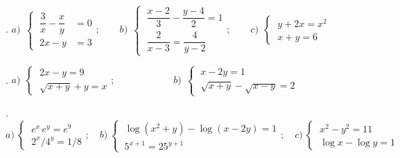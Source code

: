 \begin{mipropuesto}
. $a)\ \ \begin{cases}	\ \dfrac 3 x - \dfrac x y &=0\\ \ 2x-y&=3 \end{cases};\qquad  b)\ \ \begin{cases} \ \dfrac{x-2}{3}-\dfrac{y-4}{2}=1  \\ \  \dfrac{2}{x-3}=\dfrac{4}{y-2} \end{cases}; \qquad c)\ \ \begin{cases} \ y+2x=x^2\\\ x+y=6 \end{cases} $
\end{mipropuesto}
\vspace{-8mm}
\begin{flushright}
	\begin{footnotesize} \textcolor{gris}{}	\end{footnotesize}
\end{flushright}

\begin{mipropuesto}
. 	$a)\ \ \begin{cases} \ 2x-y=9 \\ \ \sqrt{x+y}+y=x \end{cases} ; \qquad \qquad \qquad b) \ \ \begin{cases}  \ x-2y=1\\ \ \sqrt{x+y}-\sqrt{x-y}=2 \end{cases}$
\end{mipropuesto}
\vspace{-8mm}
\begin{flushright}
	\begin{footnotesize} \textcolor{gris}{}	\end{footnotesize}
\end{flushright}

\begin{mipropuesto}
. $a)\ \begin{cases} \ e^x\, e^y=e^9 \\ \ 2^x/4^y=1/8 \end{cases}; \quad b)\ \begin{cases} \ \log(x^2+y)-\log(x-2y)=1 \\ \ 5^{x+1}=25^{y+1} \end{cases};\quad c)\ \begin{cases} \ x^2-y^2=11\\ \ \log x -\log y=1 \end{cases}$
\end{mipropuesto}
\vspace{-8mm}
\begin{flushright}
	\begin{footnotesize} \textcolor{gris}{}	\end{footnotesize}
\end{flushright}

